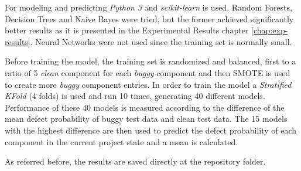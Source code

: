 For modeling and predicting \emph{Python 3} and \emph{scikit-learn} is used.
Random Forests, Decision Trees and Naive Bayes were tried, but the former achieved significantly better results as it is presented in the Experimental Results chapter \ref{chap:exp-results}.
Neural Networks were not used since the training set is normally small.

Before training the model, the training set is randomized and balanced, first to a ratio of 5 \emph{clean} component for each \emph{buggy} component
and then SMOTE is used to create more \emph{buggy} component entries. In order to train the model a \emph{Stratified KFold} (4 folds) is used and run 10 times,
generating 40 different models. Performance of these 40 models is measured according to the difference of the mean defect probability of buggy test data and clean test data.
The 15 models with the highest difference are then used to predict the defect probability of each component in the current project state and a mean is calculated.

As referred before, the results are saved directly at the repository folder.
